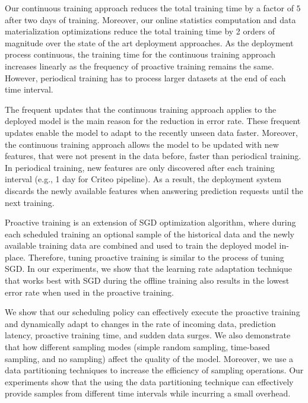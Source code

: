 Our continuous training approach reduces the total training time by a factor of $5$ after two days of training.
Moreover, our online statistics computation and data materialization optimizations reduce the total training time by 2 orders of magnitude over the state of the art deployment approaches.
As the deployment process continuous, the training time for the continuous training approach increases linearly as the frequency of proactive training remains the same.
However, periodical training has to process larger datasets at the end of each time interval.

The frequent updates that the continuous training approach applies to the deployed model is the main reason for the reduction in error rate.
These frequent updates enable the model to adapt to the recently unseen data faster.
Moreover, the continuous training approach allows the model to be updated with new features, that were not present in the data before, faster than periodical training.
In periodical training, new features are only discovered after each training interval (e.g., 1 day for Criteo pipeline).
As a result, the deployment system discards the newly available features when answering prediction requests until the next training.

Proactive training is an extension of SGD optimization algorithm, where during each scheduled training an optional sample of the historical data and the newly available training data are combined and used to train the deployed model in-place.
Therefore, tuning proactive training is similar to the process of tuning SGD.
In our experiments, we show that the learning rate adaptation technique that works best with SGD during the offline training also results in the lowest error rate when used in the proactive training.

We show that our scheduling policy can effectively execute the proactive training and dynamically adapt to changes in the rate of incoming data, prediction latency, proactive training time, and sudden data surges.
We also demonstrate that how different sampling modes (simple random sampling, time-based sampling, and no sampling) affect the quality of the model.
Moreover, we use a data partitioning techniques to increase the efficiency of sampling operations.
Our experiments show that the using the data partitioning technique can effectively provide samples from different time intervals while incurring a small overhead.




